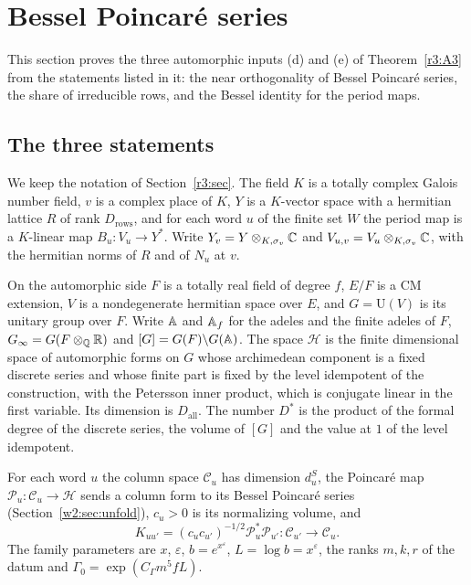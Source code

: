 \section{Bessel Poincar\'e series}\label{sec:bessel}

This section proves the three automorphic inputs (d) and (e) of Theorem~\ref{r3:A3} from the statements listed in it: the near orthogonality of Bessel Poincar\'e series, the share of irreducible rows, and the Bessel identity for the period maps.



\subsection{The three statements}\label{w2:sec:statements}

We keep the notation of Section~\ref{r3:sec}. The field $K$ is a totally complex Galois number field, $v$ is a complex place of $K$, $Y$ is a $K$-vector space with a hermitian lattice $R$ of rank $D_{\mathrm{rows}}$, and for each word $u$ of the finite set $W$ the period map is a $K$-linear map $B_u\colon V_u\to Y^*$. Write $Y_v=Y\otimes_{K,\sigma_v}\mathbb C$ and $V_{u,v}=V_u\otimes_{K,\sigma_v}\mathbb C$, with the hermitian norms of $R$ and of $N_u$ at $v$.

On the automorphic side $F$ is a totally real field of degree $f$, $E/F$ is a CM extension, $V$ is a nondegenerate hermitian space over $E$, and $G=\mathrm U(V)$ is its unitary group over $F$. Write $\mathbb A$ and $\mathbb A_f$ for the adeles and the finite adeles of $F$, $G_\infty=G(F\otimes_{\mathbb Q}\mathbb R)$ and $[G]=G(F)\backslash G(\mathbb A)$. The space $\mathcal H$ is the finite dimensional space of automorphic forms on $G$ whose archimedean component is a fixed discrete series and whose finite part is fixed by the level idempotent of the construction, with the Petersson inner product, which is conjugate linear in the first variable. Its dimension is $D_{\mathrm{all}}$. The number $D^*$ is the product of the formal degree of the discrete series, the volume of $[G]$ and the value at $1$ of the level idempotent.

For each word $u$ the column space $\mathcal C_u$ has dimension $d^S_u$, the Poincar\'e map $\mathcal P_u\colon\mathcal C_u\to\mathcal H$ sends a column form to its Bessel Poincar\'e series (Section~\ref{w2:sec:unfold}), $c_u>0$ is its normalizing volume, and
\[
K_{uu'}=(c_uc_{u'})^{-1/2}\mathcal P_u^*\mathcal P_{u'}\colon\mathcal C_{u'}\to\mathcal C_u .
\]
The family parameters are $x$, $\varepsilon$, $b=e^{x^\varepsilon}$, $L=\log b=x^\varepsilon$, the ranks $m,k,r$ of the datum and $\Gamma_0=\exp(C_\Gamma m^5fL)$.

